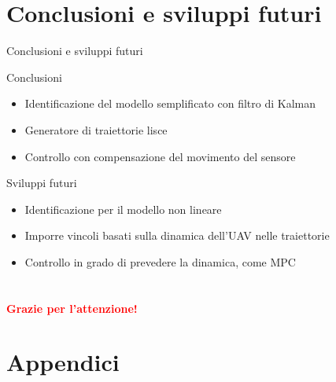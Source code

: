 \documentclass[]{beamer}
\begin{document}
	
	\section{Conclusioni e sviluppi futuri}
		
	\begin{frame}{Conclusioni e sviluppi futuri}
		\centering
		\begin{block}{Conclusioni}
			\begin{itemize}
				\item Identificazione del modello semplificato con filtro di Kalman 
				\item Generatore di traiettorie lisce
				\item Controllo con compensazione del movimento del sensore
			\end{itemize}
		\end{block}
		\begin{block}{Sviluppi futuri}
			\begin{itemize}
				\item Identificazione per il modello non lineare
				\item Imporre vincoli basati sulla dinamica dell'UAV nelle traiettorie
				\item Controllo in grado di prevedere la dinamica, come MPC
			\end{itemize}
		\end{block}
	\end{frame}
	
	
	\section{}
	
	\begin{frame}
		\centering
		\Huge
		\textbf{\textcolor{red}{Grazie per l'attenzione!}}
	\end{frame}
	
	
	\section{Appendici}
	
\end{document}
